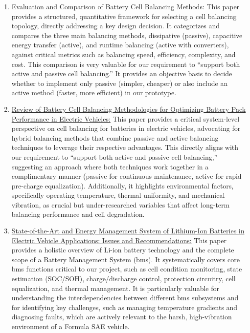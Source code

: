 \begin{enumerate}
	\item \href{https://web.archive.org/web/20200508032842id_/https://eprint.ncl.ac.uk/file_store/production/261931/F4ADEC30-2EDD-4881-A81A-AC0BFDE3D9EB.pdf}{Evaluation and Comparison of Battery Cell Balancing Methods:} This paper provides a structured, quantitative framework for selecting a cell balancing topology, directly addressing a key design decision. It categorizes and compares the three main balancing methods, dissipative (passive), capacitive energy transfer (active), and runtime balancing (active with converters), against critical metrics such as balancing speed, efficiency, complexity, and cost. This comparison is very valuable for our requirement to “support both active and passive cell balancing.” It provides an objective basis to decide whether to implement only passive (simpler, cheaper) or also include an active method (faster, more efficient) in our prototype.
	
	\item \href{https://ieeexplore.ieee.org/stamp/stamp.jsp?arnumber=8834858}{Review of Battery Cell Balancing Methodologies for Optimizing Battery Pack Performance in Electric Vehicles:} This paper provides a critical system-level perspective on cell balancing for batteries in electric vehicles, advocating for hybrid balancing methods that combine passive and active balancing techniques to leverage their respective advantages. This directly aligns with our requirement to “support both active and passive cell balancing,” suggesting an approach where both techniques work together in a complimentary manner (passive for continuous maintenance, active for rapid pre-charge equalization). Additionally, it highlights environmental factors, specifically operating temperature, thermal uniformity, and mechanical vibration, as crucial but under-researched variables that affect long-term balancing performance and cell degradation.
	
	\item \href{https://ieeexplore.ieee.org/stamp/stamp.jsp?arnumber=8320763}{State-of-the-Art and Energy Management System of Lithium-Ion Batteries in Electric Vehicle Applications: Issues and Recommendations:} This paper provides a holistic overview of Li-ion battery technology and the complete scope of a Battery Management System (\gls{bms}). It systematically covers core \gls{bms} functions critical to our project, such as cell condition monitoring, state estimation (SOC/SOH), charge/discharge control, protection circuitry, cell equalization, and thermal management. It is particularly valuable for understanding the interdependencies between different \gls{bms} subsystems and for identifying key challenges, such as managing temperature gradients and diagnosing faults, which are actively relevant to the harsh, high-vibration environment of a Formula SAE vehicle.
\end{enumerate}